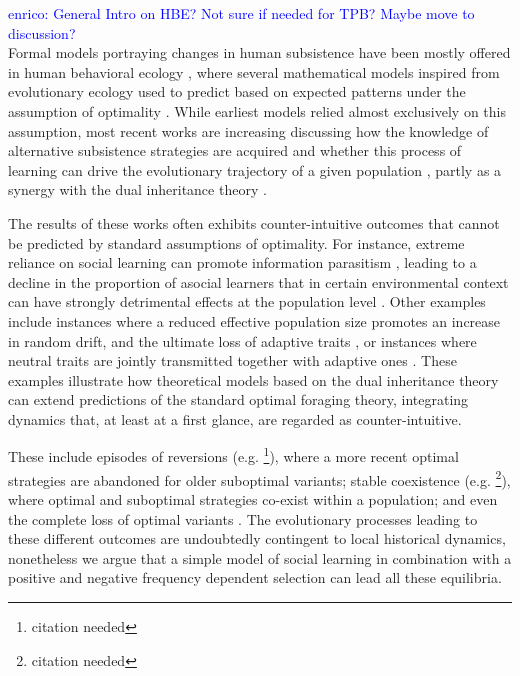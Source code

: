 \documentclass[preprint,authoryear]{elsarticle}
\newcommand{\memo}[2]{\textcolor{#1}{#2}}
\newcommand{\enrico}[1]{\memo{blue}{enrico: #1\\}}
\begin{document}
\enrico{General Intro on HBE? Not sure if needed for TPB? Maybe move to discussion?}
Formal models portraying changes in human subsistence have been mostly offered in human behavioral ecology \citep{smith1992,bird2006,kennett2006}, where several mathematical models inspired from evolutionary ecology %
 used to predict  based on expected patterns under the assumption of optimality \citep{belovsky1988}. 
While earliest models relied almost exclusively on this assumption, most recent works are increasing discussing how the knowledge of alternative subsistence strategies are acquired %
and whether this process of learning can drive the evolutionary trajectory of a given population \citep{henrich1998}, partly as a synergy with the dual inheritance theory \citep{boyd1985}. 

The results of these works often exhibits counter-intuitive outcomes that cannot be predicted by standard assumptions of optimality. For instance, extreme reliance on social learning can promote information parasitism \citep{giraldeau2002}, leading to a decline in the proportion of asocial learners that in certain environmental context can have strongly detrimental effects at the population level \citep{whitehead2009}. Other examples include instances where a reduced effective population size promotes an increase in random drift, and the ultimate loss of adaptive traits \citep{henrich2004}, or instances where neutral traits are jointly transmitted together with adaptive ones \citep{ackland2007}. These examples illustrate how theoretical models based on the dual inheritance theory can extend predictions of the standard optimal foraging theory, integrating dynamics that, at least at a first glance, are regarded as counter-intuitive. 

These include episodes of reversions (e.g. \footnote{citation needed}), where a more recent optimal strategies are abandoned for older suboptimal variants; stable coexistence (e.g. \footnote{citation needed}), where optimal and suboptimal strategies co-exist within a population; and even the complete loss of optimal variants \citep[e.g.][]{henrich2004}. The evolutionary processes leading to these different outcomes are undoubtedly contingent to local historical dynamics, nonetheless we argue that a simple model of social learning in combination with a positive and negative frequency dependent selection can lead all these equilibria.
\end{document}
